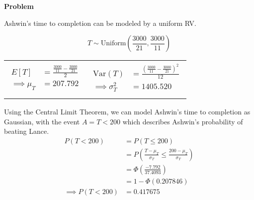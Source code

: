 \documentclass[12pt]{article}
\newenvironment{Ex}{\textbf{Problem}\vspace{.75em}\\}{}
\begin{document}
\begin{enumerate}
\begin{Ex}
\begin{solution}
\begin{enumerate}
        Ashwin's time to completion can be modeled by a uniform RV.
        \begin{table}[H]
          \begin{equation}
            \label{eq:4d-time}
            T\sim\text{Uniform}\left(\frac{3000}{21},\frac{3000}{11}\right)
          \end{equation}
          \begin{tabularx}{\linewidth}{XX}
            \begin{equation}
              \label{eq:4d-mean}
              \begin{aligned}
                E[T] &= \frac{\frac{3000}{11} - \frac{3000}{21}}{2} \\
                \implies \mu_T &= 207.792 \\
              \end{aligned}
            \end{equation}
            &
            \begin{equation}
              \label{eq:4d-var}
              \begin{aligned}
                \text{Var}(T) &= \frac{(\frac{3000}{11} - \frac{3000}{21})^2}{12} \\
                \implies \sigma_T^2 &= 1405.520 \\
              \end{aligned}
            \end{equation}
          \end{tabularx}
        \end{table}
        Using the Central Limit Theorem, we can model Ashwin's time to
        completion as Gaussian, with the event $A=T<200$ which
        describes Ashwin's probability of beating Lance.
        \begin{equation}
          \label{eq:4d-sol}
          \begin{aligned}
            P(T<200) &= P(T\le 200) \\
            &= P\left(\frac{T-\mu_T}{\sigma_T} \le
              \frac{200-\mu_T}{\sigma_T}\right) \\
            &= \Phi\left(\frac{-7.792}{37.4093}\right) \\
            &= 1 - \Phi(0.207846) \\
            \implies P(T<200) &= 0.417675 \\
          \end{aligned}
        \end{equation}
      \end{enumerate}
    \end{solution}
  \end{Ex}


\end{enumerate}
\end{document}
